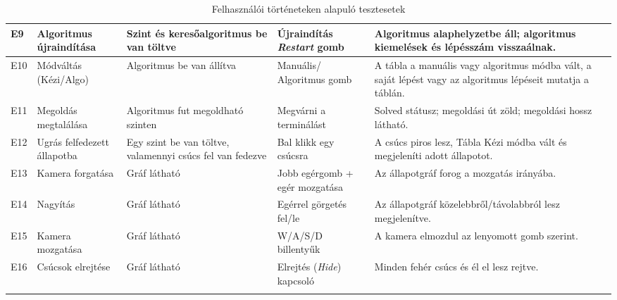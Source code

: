 \begin{longtable}{ | p{} | p{} | p{} | p{} | p{} | }
E9
& Algoritmus újraindítása
& Szint és keresőalgoritmus be van töltve
& Újraindítás \textit{Restart} gomb
& Algoritmus alaphelyzetbe áll; algoritmus kiemelések és lépésszám visszaálnak.
\\ \hline

E10
& Módváltás (Kézi/Algo)
& Algoritmus be van állítva
& Manuális/ Algoritmus gomb
& A tábla a manuális vagy algoritmus módba vált, a saját lépést vagy az algoritmus lépéseit mutatja a táblán.
\\ \hline

E11
& Megoldás megtalálása
& Algoritmus fut megoldható szinten
& Megvárni a terminálást 
& Solved státusz; megoldási út zöld; megoldási hossz látható.
\\ \hline

E12
& Ugrás felfedezett állapotba
& Egy szint be van töltve, valamennyi csúcs fel van fedezve
& Bal klikk egy csúcsra
& A csúcs piros lesz, Tábla Kézi módba vált és megjeleníti adott állapotot.
\\ \hline

E13
& Kamera forgatása
& Gráf látható
& Jobb egérgomb + egér mozgatása
& Az állapotgráf forog a mozgatás irányába.
\\ \hline

E14
& Nagyítás
& Gráf látható
& Egérrel görgetés fel/le
& Az állapotgráf közelebbről/távolabbról lesz megjelenítve.
\\ \hline

E15
& Kamera mozgatása
& Gráf látható
& W/A/S/D billentyűk
& A kamera elmozdul az lenyomott gomb szerint.
\\ \hline

E16
& Csúcsok elrejtése
& Gráf látható
& Elrejtés (\textit{Hide}) kapcsoló
& Minden fehér csúcs és él el lesz rejtve.
\\ \hline

\caption{Felhasználói történeteken alapuló tesztesetek}
\label{tab:user-tests}
\end{longtable}
